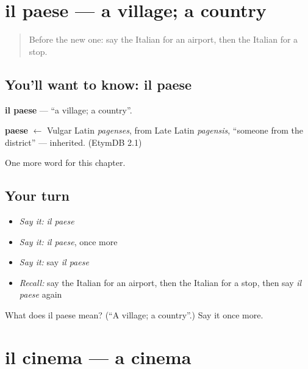 \section[il paese]{il paese — a village; a country}

\label{lesson:IT-C87-paese}



\begin{quote}
Before the new one: say the Italian for an airport, then the Italian for a stop.
\end{quote}

\subsection*{You'll want to know: il paese}
\textbf{il paese} — \textquotedblleft{}a village; a country\textquotedblright{}.

\begin{cousinweb}
\textbf{paese} $\leftarrow$ Vulgar Latin \emph{pagenses}, from Late Latin \emph{pagensis}, \textquotedblleft{}someone from the district\textquotedblright{} — inherited. (EtymDB 2.1)
\end{cousinweb}

\begin{grammarlens}[title={What you've built}]
One more word for this chapter.
\end{grammarlens}

\subsection*{Your turn}
\begin{itemize}
\raggedright
  \item \emph{Say it:} \emph{il paese}
  \item \emph{Say it:} \emph{il paese}, once more
  \item \emph{Say it:} say \emph{il paese}
  \item \emph{Recall:} say the Italian for an airport, then the Italian for a stop, then say \emph{il paese} again
\end{itemize}

\begin{tcolorbox}[breakable,colback=teal!4,colframe=teal!35!black,title={Before you move on}]
What does il paese mean? (\textquotedblleft{}A village; a country\textquotedblright{}.) Say it once more.
\end{tcolorbox}
\section[il cinema]{il cinema — a cinema}

